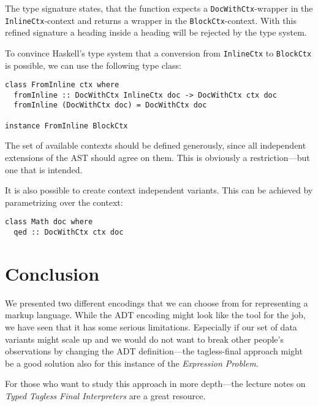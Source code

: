 The type signature states, that the function expects a
\texttt{DocWithCtx}-wrapper in the \texttt{InlineCtx}-context and returns a
wrapper in the \texttt{BlockCtx}-context. With this refined signature a heading
inside a heading will be rejected by the type system.

To convince Haskell’s type system that a conversion from \texttt{InlineCtx} to
\texttt{BlockCtx} is possible, we can use the following type class:

\begin{lstlisting}
class FromInline ctx where
  fromInline :: DocWithCtx InlineCtx doc -> DocWithCtx ctx doc
  fromInline (DocWithCtx doc) = DocWithCtx doc

instance FromInline BlockCtx
\end{lstlisting}


The set of available contexts should be defined generously, since all
independent extensions of the AST should agree on them. This is obviously a
restriction—but one that is intended.

It is also possible to create context independent variants. This can be
achieved by parametrizing over the context:

\begin{lstlisting}
class Math doc where
  qed :: DocWithCtx ctx doc
\end{lstlisting}


\section{Conclusion}

We presented two different encodings that we can choose from for representing a
markup language. While the ADT encoding might look like the tool for the job, we
have seen that it has some serious limitations. Especially if our set of data
variants might scale up and we would do not want to break other people's
observations by changing the ADT definition—the tagless-final approach might be
a good solution also for this instance of the \emph{Expression Problem}.

For those who want to study this approach in more depth—the lecture notes on
\emph{Typed Tagless Final Interpreters} \cite{finally-tagless-tut} are a great
resource.
